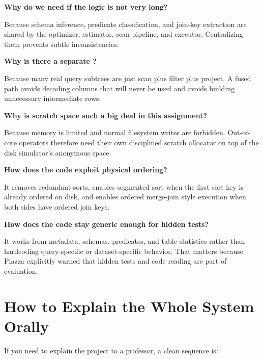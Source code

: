 \documentclass[11pt]{article}
\begin{document}
\textbf{Why do we need  if the logic is not very long?}

Because schema inference, predicate classification, and join-key extraction are shared by the optimizer, estimator, scan pipeline, and executor. Centralizing them prevents subtle inconsistencies.

\textbf{Why is there a separate ?}

Because many real query subtrees are just scan plus filter plus project. A fused path avoids decoding columns that will never be used and avoids building unnecessary intermediate rows.

\textbf{Why is scratch space such a big deal in this assignment?}

Because memory is limited and normal filesystem writes are forbidden. Out-of-core operators therefore need their own disciplined scratch allocator on top of the disk simulator's anonymous space.

\textbf{How does the code exploit physical ordering?}

It removes redundant sorts, enables segmented sort when the first sort key is already ordered on disk, and enables ordered merge-join style execution when both sides have ordered join keys.

\textbf{How does the code stay generic enough for hidden tests?}

It works from metadata, schemas, predicates, and table statistics rather than hardcoding query-specific or dataset-specific behavior. That matters because Piazza explicitly warned that hidden tests and code reading are part of evaluation.

\section{How to Explain the Whole System Orally}
If you need to explain the project to a professor, a clean sequence is:
\end{document}
